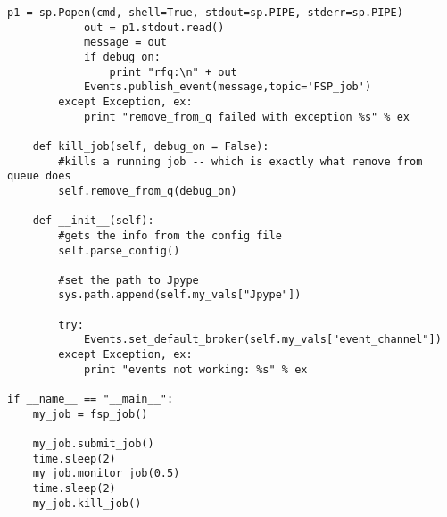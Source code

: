 \begin{lstlisting}[frame=single,
    caption={batch\_mgmt\_script.py}, label=batchscript]
            p1 = sp.Popen(cmd, shell=True, stdout=sp.PIPE, stderr=sp.PIPE)
            out = p1.stdout.read()
            message = out
            if debug_on:
                print "rfq:\n" + out
            Events.publish_event(message,topic='FSP_job')
        except Exception, ex:
            print "remove_from_q failed with exception %s" % ex
            
    def kill_job(self, debug_on = False):
        #kills a running job -- which is exactly what remove from queue does
        self.remove_from_q(debug_on)
            
    def __init__(self):
        #gets the info from the config file
        self.parse_config()

        #set the path to Jpype 
        sys.path.append(self.my_vals["Jpype"])

        try:
            Events.set_default_broker(self.my_vals["event_channel"])
        except Exception, ex:
            print "events not working: %s" % ex

if __name__ == "__main__":
    my_job = fsp_job()

    my_job.submit_job()
    time.sleep(2)
    my_job.monitor_job(0.5)
    time.sleep(2)
    my_job.kill_job()

\end{lstlisting}

